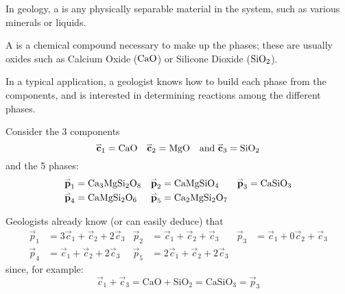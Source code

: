 
\begin{applicationActivities}

\begin{definition}
In geology, a  is any physically separable material in the system, such as various minerals or liquids.

\vspace{1em}

A  is a chemical compound necessary to make up the phases; these are usually oxides such as Calcium Oxide (${\rm CaO}$) or Silicone Dioxide (${\rm SiO_2}$).

\vspace{1em}

In a typical application, a geologist knows how to build each phase from the components, and is interested in determining reactions among the different phases.
\end{definition}

\begin{observation}
Consider the 3 components 
\[\vec{c}_1={\rm CaO} \hspace{1em} \vec{c}_2={\rm MgO} \hspace{1em} \text{and } \vec{c}_3={\rm SiO_2}\]
and the 5 phases:
\begin{align*}
\vec{p}_1 &= {\rm Ca_3MgSi_2O_8} & \vec{p}_2 &= {\rm CaMgSiO_4} & \vec{p}_3 &= {\rm CaSiO_3} \\
\vec{p}_4 &= {\rm CaMgSi_2O_6} & \vec{p}_5 &= {\rm Ca_2MgSi_2O_7}
\end{align*}

Geologists already know (or can easily deduce) that
\begin{align*}
\vec{p}_1 &= 3\vec{c}_1 + \vec{c}_2 + 2 \vec{c}_3 & \vec{p}_2 &= \vec{c}_1 +\vec{c}_2 + \vec{c}_3  &
\vec{p}_3 &= \vec{c}_1 + 0\vec{c}_2 +  \vec{c}_3 \\
\vec{p}_4 &= \vec{c}_1 +\vec{c}_2 + 2\vec{c}_3 &  \vec{p}_5 &= 2\vec{c}_1 + \vec{c}_2 + 2 \vec{c}_3 
\end{align*}
since, for example:
\[
\vec c_1+\vec c_3 = \mathrm{CaO} + \mathrm{SiO_2} = \mathrm{CaSiO_3} = \vec p_3  
\]
\end{observation}


\end{applicationActivities}
